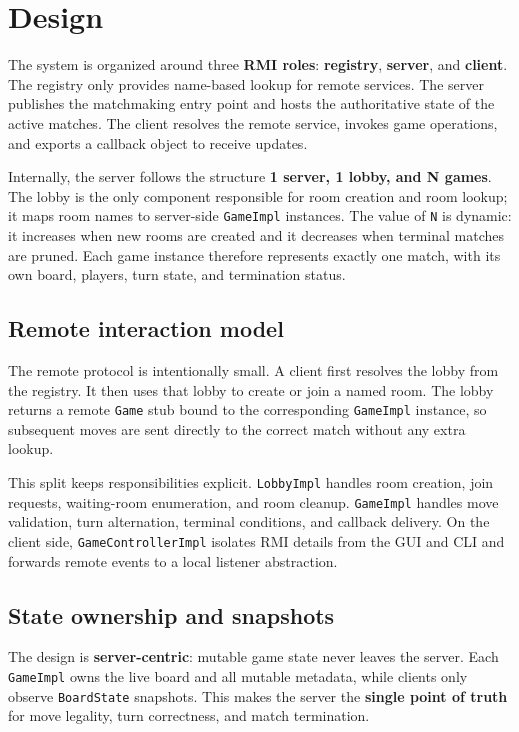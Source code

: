 \clearpage
\section{Design}

The system is organized around three \textbf{RMI roles}: \textbf{registry},
\textbf{server}, and \textbf{client}. The registry only provides name-based
lookup for remote services. The server publishes the matchmaking entry point
and hosts the authoritative state of the active matches. The client resolves
the remote service, invokes game operations, and exports a callback object to
receive updates.

Internally, the server follows the structure \textbf{1 server, 1 lobby, and N
games}. The lobby is the only component responsible for room creation and room
lookup; it maps room names to server-side \texttt{GameImpl} instances. The
value of \texttt{N} is dynamic: it increases when new rooms are created and it
decreases when terminal matches are pruned. Each game instance therefore
represents exactly one match, with its own board, players, turn state, and
termination status.

\subsection{Remote interaction model}

The remote protocol is intentionally small. A client first resolves the lobby
from the registry. It then uses that lobby to create or join a named room. The
lobby returns a remote \texttt{Game} stub bound to the corresponding
\texttt{GameImpl} instance, so subsequent moves are sent directly to the
correct match without any extra lookup.

This split keeps responsibilities explicit. \texttt{LobbyImpl} handles room
creation, join requests, waiting-room enumeration, and room cleanup.
\texttt{GameImpl} handles move validation, turn alternation, terminal
conditions, and callback delivery. On the client side,
\texttt{GameControllerImpl} isolates RMI details from the GUI and CLI and
forwards remote events to a local listener abstraction.

\subsection{State ownership and snapshots}

The design is \textbf{server-centric}: mutable game state never leaves the
server. Each \texttt{GameImpl} owns the live board and all mutable metadata,
while clients only observe \texttt{BoardState} snapshots. This makes the
server the \textbf{single point of truth} for move legality, turn correctness,
and match termination.

